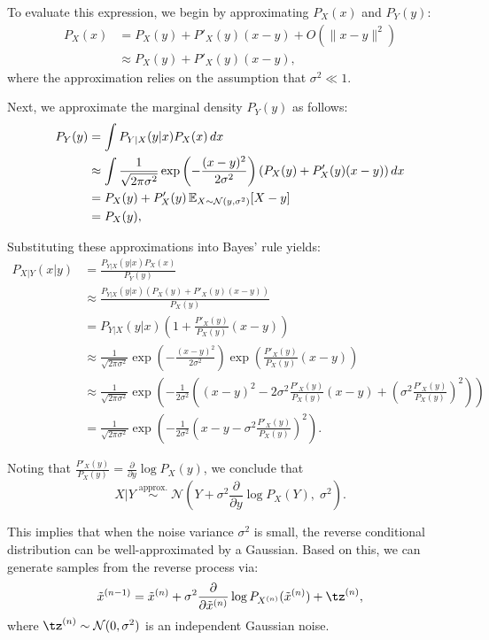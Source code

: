\documentclass[11pt, a4paper]{article}
\begin{document}
To evaluate this expression, we begin by approximating \( P_X(x) \) and \( P_Y(y) \):
\begin{align*}
    P_X(x)
    & = P_X(y) + P'_X(y)(x - y) + O(\|x - y\|^2) \\
    & \approx P_X(y) + P'_X(y)(x - y),
\end{align*}
where the approximation relies on the assumption that \( \sigma^2 \ll 1 \).

Next, we approximate the marginal density \( P_Y(y) \) as follows:
\begin{align*}
    P_Y(y)
    & = \int P_{Y|X}(y|x) P_X(x) \, dx \\
    & \approx \int \frac{1}{\sqrt{2\pi\sigma^2}} \exp\left( -\frac{(x - y)^2}{2\sigma^2} \right) \left(P_X(y) + P'_X(y)(x - y)\right) dx \\
    & = P_X(y) + P'_X(y) \, \mathbb{E}_{X \sim \mathcal{N}(y, \sigma^2)}[X - y] \\
    & = P_X(y),
\end{align*}

Substituting these approximations into Bayes' rule yields:
\begin{align*}
    P_{X|Y}(x|y)
    & = \frac{P_{Y|X}(y|x) P_X(x)}{P_Y(y)} \\
    & \approx \frac{P_{Y|X}(y|x)\left(P_X(y) + P'_X(y)(x - y)\right)}{P_X(y)} \\
    & = P_{Y|X}(y|x)\left(1 + \frac{P'_X(y)}{P_X(y)} (x - y)\right) \\
    & \approx \frac{1}{\sqrt{2\pi\sigma^2}} \exp\left( -\frac{(x - y)^2}{2\sigma^2} \right) \exp\left( \frac{P'_X(y)}{P_X(y)} (x - y) \right) \\
    & \approx \frac{1}{\sqrt{2\pi\sigma^2}} \exp\left( -\frac{1}{2\sigma^2} \left((x - y)^2 - 2\sigma^2 \frac{P'_X(y)}{P_X(y)} (x - y) + \left(\sigma^2 \frac{P'_X(y)}{P_X(y)}\right)^2 \right) \right) \\
    & = \frac{1}{\sqrt{2\pi\sigma^2}} \exp\left( -\frac{1}{2\sigma^2} \left(x - y - \sigma^2 \frac{P'_X(y)}{P_X(y)}\right)^2 \right).
\end{align*}

Noting that \( \frac{P'_X(y)}{P_X(y)} = \frac{\partial}{\partial y} \log P_X(y) \), we conclude that
\[
X|Y \; \overset{\text{approx.}}{\sim} \; \mathcal{N}\left(Y + \sigma^2 \frac{\partial}{\partial y} \log P_X(Y), \; \sigma^2\right).
\]

This implies that when the noise variance \( \sigma^2 \) is small, the reverse conditional distribution can be well-approximated by a Gaussian.  
Based on this, we can generate samples from the reverse process via:
\[
\tx^{(n-1)} = \tx^{(n)} + \sigma^2 \frac{\partial}{\partial \tx^{(n)}} \log P_{X^{(n)}} (\tx^{(n)}) + \tz^{(n)},
\]
where \( \tz^{(n)} \sim \mathcal{N}(0, \sigma^2) \) is an independent Gaussian noise.
\end{document}
